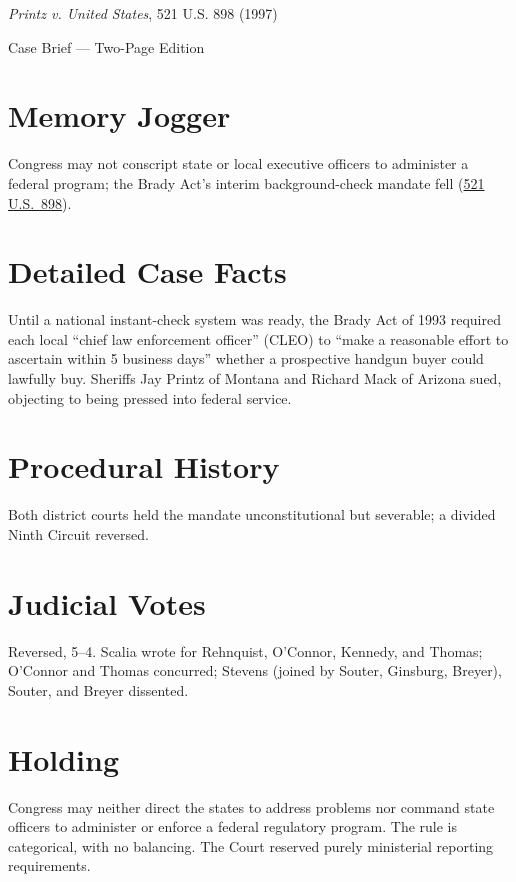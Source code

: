 \documentclass[12pt]{article}
\begin{document}
\begin{center}
{\LARGE \textit{Printz v. United States}, 521 U.S. 898 (1997)\par}
\vspace{0.5em}
{\large Case Brief --- Two-Page Edition\par}
\end{center}

\section{Memory Jogger}
Congress may not conscript state or local executive officers to administer a federal program; the Brady Act's interim background-check mandate fell (\href{https://www.law.cornell.edu/supct/html/95-1478.ZO.html}{521 U.S.\ 898}).

\section{Detailed Case Facts}
Until a national instant-check system was ready, the Brady Act of 1993 required each local ``chief law enforcement officer'' (CLEO) to ``make a reasonable effort to ascertain within 5 business days'' whether a prospective handgun buyer could lawfully buy. Sheriffs Jay Printz of Montana and Richard Mack of Arizona sued, objecting to being pressed into federal service.

\section{Procedural History}
Both district courts held the mandate unconstitutional but severable; a divided Ninth Circuit reversed.

\section{Judicial Votes}
Reversed, 5--4. Scalia wrote for Rehnquist, O'Connor, Kennedy, and Thomas; O'Connor and Thomas concurred; Stevens (joined by Souter, Ginsburg, Breyer), Souter, and Breyer dissented.

\section{Holding}
Congress may neither direct the states to address problems nor command state officers to administer or enforce a federal regulatory program. The rule is categorical, with no balancing. The Court reserved purely ministerial reporting requirements.
\end{document}

